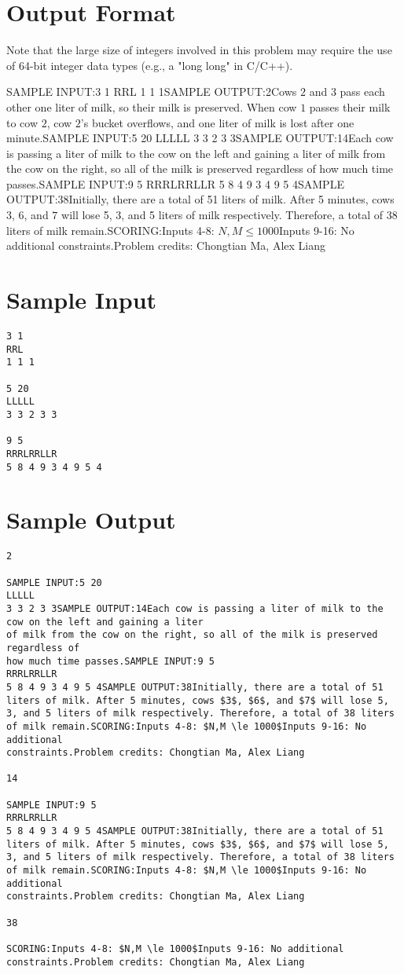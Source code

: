 \documentclass[12pt]{article}
\begin{document}
\section*{Output Format}
Note that the large size of integers involved in this problem may require the
use of 64-bit integer data types (e.g., a "long long" in C/C++).

SAMPLE INPUT:3 1
RRL
1 1 1SAMPLE OUTPUT:2Cows $2$ and $3$ pass each other one liter of milk, so their milk is preserved.
When cow $1$ passes their milk to cow $2$, cow $2$'s bucket overflows, and one
liter of milk is lost after one minute.SAMPLE INPUT:5 20
LLLLL
3 3 2 3 3SAMPLE OUTPUT:14Each cow is passing a liter of milk to the cow on the left and gaining a liter
of milk from the cow on the right, so all of the milk is preserved regardless of
how much time passes.SAMPLE INPUT:9 5
RRRLRRLLR
5 8 4 9 3 4 9 5 4SAMPLE OUTPUT:38Initially, there are a total of 51 liters of milk. After 5 minutes, cows $3$, $6$, and $7$ will lose 5, 3, and 5 liters of milk respectively. Therefore, a total of 38 liters of milk remain.SCORING:Inputs 4-8: $N,M \le 1000$Inputs 9-16: No additional
constraints.Problem credits: Chongtian Ma, Alex Liang

\section*{Sample Input}
\begin{verbatim}
3 1
RRL
1 1 1

5 20
LLLLL
3 3 2 3 3

9 5
RRRLRRLLR
5 8 4 9 3 4 9 5 4
\end{verbatim}

\section*{Sample Output}
\begin{verbatim}
2

SAMPLE INPUT:5 20
LLLLL
3 3 2 3 3SAMPLE OUTPUT:14Each cow is passing a liter of milk to the cow on the left and gaining a liter
of milk from the cow on the right, so all of the milk is preserved regardless of
how much time passes.SAMPLE INPUT:9 5
RRRLRRLLR
5 8 4 9 3 4 9 5 4SAMPLE OUTPUT:38Initially, there are a total of 51 liters of milk. After 5 minutes, cows $3$, $6$, and $7$ will lose 5, 3, and 5 liters of milk respectively. Therefore, a total of 38 liters of milk remain.SCORING:Inputs 4-8: $N,M \le 1000$Inputs 9-16: No additional
constraints.Problem credits: Chongtian Ma, Alex Liang

14

SAMPLE INPUT:9 5
RRRLRRLLR
5 8 4 9 3 4 9 5 4SAMPLE OUTPUT:38Initially, there are a total of 51 liters of milk. After 5 minutes, cows $3$, $6$, and $7$ will lose 5, 3, and 5 liters of milk respectively. Therefore, a total of 38 liters of milk remain.SCORING:Inputs 4-8: $N,M \le 1000$Inputs 9-16: No additional
constraints.Problem credits: Chongtian Ma, Alex Liang

38

SCORING:Inputs 4-8: $N,M \le 1000$Inputs 9-16: No additional
constraints.Problem credits: Chongtian Ma, Alex Liang
\end{verbatim}
\end{document}

